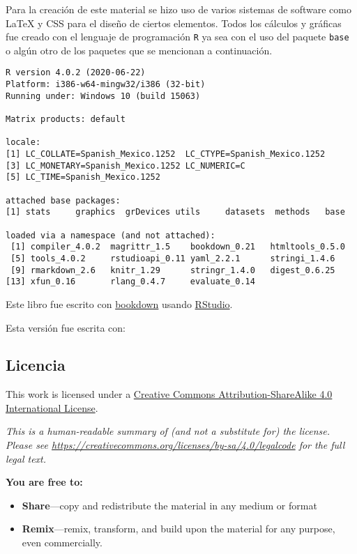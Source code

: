 \documentclass[a4paper,oneside,openany]{book}
\begin{document}
Para la creación de este material se hizo uso de varios sistemas de
software como LaTeX y CSS para el diseño de ciertos elementos. Todos los
cálculos y gráficas fue creado con el lenguaje de programación
\texttt{R} ya sea con el uso del paquete \texttt{base} o algún otro de
los paquetes que se mencionan a continuación.

\begin{verbatim}
R version 4.0.2 (2020-06-22)
Platform: i386-w64-mingw32/i386 (32-bit)
Running under: Windows 10 (build 15063)

Matrix products: default

locale:
[1] LC_COLLATE=Spanish_Mexico.1252  LC_CTYPE=Spanish_Mexico.1252   
[3] LC_MONETARY=Spanish_Mexico.1252 LC_NUMERIC=C                   
[5] LC_TIME=Spanish_Mexico.1252    

attached base packages:
[1] stats     graphics  grDevices utils     datasets  methods   base     

loaded via a namespace (and not attached):
 [1] compiler_4.0.2  magrittr_1.5    bookdown_0.21   htmltools_0.5.0
 [5] tools_4.0.2     rstudioapi_0.11 yaml_2.2.1      stringi_1.4.6  
 [9] rmarkdown_2.6   knitr_1.29      stringr_1.4.0   digest_0.6.25  
[13] xfun_0.16       rlang_0.4.7     evaluate_0.14  
\end{verbatim}

Este libro fue escrito con \href{http://bookdown.org/}{bookdown} usando
\href{http://www.rstudio.com/ide/}{RStudio}.

Esta versión fue escrita con:

\subsection*{Licencia}\label{licencia}


This work is licensed under a
\href{https://creativecommons.org/licenses/by-sa/4.0/}{Creative Commons
Attribution-ShareAlike 4.0 International License}.

\emph{This is a human-readable summary of (and not a substitute for) the
license. Please see
\url{https://creativecommons.org/licenses/by-sa/4.0/legalcode} for the
full legal text.}

\textbf{You are free to:}

\begin{itemize}
\item
  \textbf{Share}---copy and redistribute the material in any medium or
  format
\item
  \textbf{Remix}---remix, transform, and build upon the material for any
  purpose, even commercially.
\end{itemize}
\end{document}
